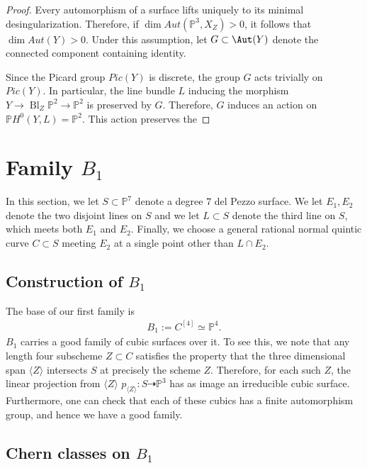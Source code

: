 \documentclass[12 pt]{amsart}
\renewcommand{\P}{\mathbb{P}}
\newcommand{\<}{\left\langle}
\renewcommand{\>}{\right\rangle}
\DeclareMathOperator{\Bl}{Bl}
\begin{document}
\begin{proof}
  Every automorphism of a surface lifts uniquely to its minimal
  desingularization. Therefore, if $\dim Aut(\P^3,X_Z) >0 $, it
  follows that $\dim Aut(Y) >0$. Under this assumption, let
  $G \subset \Aut(Y)$ denote the connected component containing
  identity.

  Since the Picard group $Pic(Y)$ is discrete, the group $G$ acts
  trivially on $Pic(Y)$.  In particular, the line bundle $L$ inducing
  the morphism $Y \to \Bl_{Z}\P^2 \to \P^2$ is preserved by
  $G$. Therefore, $G$ induces an action on $\P H^0(Y,L)= \P^2$.  This action preserves the 

  
\end{proof}




\section{Family $B_1$}
\label{sec:first-test-family}

In this section, we let $S \subset \P^7$ denote a degree $7$ del Pezzo
surface. We let $E_{1}, E_{2}$ denote the two disjoint lines on $S$
and we let $L \subset S$ denote the third line on $S$, which meets
both $E_{1}$ and $E_{2}$. Finally, we choose a general rational normal
quintic curve $C \subset S$ meeting $E_{2}$ at a single point other
than $L \cap E_{2}$.

\subsection{Construction of $B_1$}
\label{sec:construction-b_1}


The base of our first family is
\begin{align}
  \label{eq:B1}
  B_1 := C^{[4]} \simeq \P^{4}.
\end{align}
$B_1$ carries a good family of cubic surfaces over it.  To see this,
we note that any length four subscheme $Z \subset C$ satisfies the
property that the three dimensional span $\langle Z \rangle$
intersects $S$ at precisely the scheme $Z$. Therefore, for each such
$Z$, the linear projection from $\langle Z \rangle$
$p_{\langle Z \rangle}: S \dashrightarrow \P^{3}$ has as image an
irreducible cubic surface.  Furthermore, one can check that each of
these cubics has a finite automorphism group, and hence we have a good
family.

\subsection{Chern classes on $B_1$}
\label{sec:chern-classes-b_1}
\end{document}
